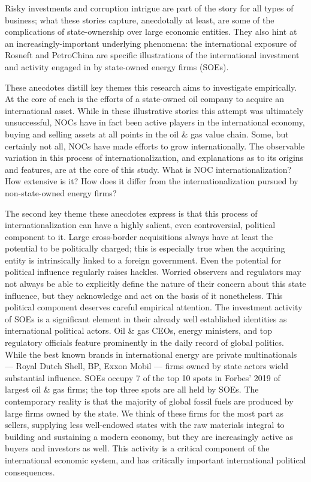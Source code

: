 \documentclass[11pt,]{book}
\begin{document}
Risky investments and corruption intrigue are part of the story for all types of business; what these stories capture, anecdotally at least, are some of the complications of state-ownership over large economic entities. They also hint at an increasingly-important underlying phenomena: the international exposure of Rosneft and PetroChina are specific illustrations of the international investment and activity engaged in by state-owned energy firms (SOEs).

These anecdotes distill key themes this research aims to investigate empirically. At the core of each is the efforts of a state-owned oil company to acquire an international asset. While in these illustrative stories this attempt was ultimately unsuccessful, NOCs have in fact been active players in the international economy, buying and selling assets at all points in the oil \& gas value chain. Some, but certainly not all, NOCs have made efforts to grow internationally. The observable variation in this process of internationalization, and explanations as to its origins and features, are at the core of this study. What is NOC internationalization? How extensive is it? How does it differ from the internationalization pursued by non-state-owned energy firms?

The second key theme these anecdotes express is that this process of internationalization can have a highly salient, even controversial, political component to it. Large cross-border acquisitions always have at least the potential to be politically charged; this is especially true when the acquiring entity is intrinsically linked to a foreign government. Even the potential for political influence regularly raises hackles. Worried observers and regulators may not always be able to explicitly define the nature of their concern about this state influence, but they acknowledge and act on the basis of it nonetheless. This political component deserves careful empirical attention. The investment activity of SOEs is a significant element in their already well established identities as international political actors. Oil \& gas CEOs, energy ministers, and top regulatory officials feature prominently in the daily record of global politics. While the best known brands in international energy are private multinationals --- Royal Dutch Shell, BP, Exxon Mobil --- firms owned by state actors wield substantial influence. SOEs occupy 7 of the top 10 spots in Forbes' 2019 of largest oil \& gas firms; the top three spots are all held by SOEs. The contemporary reality is that the majority of global fossil fuels are produced by large firms owned by the state. We think of these firms for the most part as sellers, supplying less well-endowed states with the raw materials integral to building and sustaining a modern economy, but they are increasingly active as buyers and investors as well. This activity is a critical component of the international economic system, and has critically important international political consequences.
\end{document}
